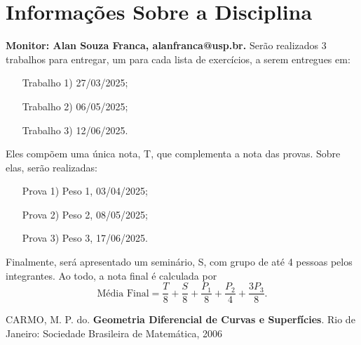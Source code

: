 \documentclass{article}
\begin{document}
\section{Informações Sobre a Disciplina}

\textbf{Monitor: Alan Souza Franca, alanfranca@usp.br.}
Serão realizados 3 trabalhos para entregar, um para cada lista de exercícios, a serem entregues em:
\begin{itemize}
	\item[Trabalho 1)] 27/03/2025;
	\item[Trabalho 2)] 06/05/2025;
	\item[Trabalho 3)] 12/06/2025.
\end{itemize}

Eles compõem uma única nota, T, que complementa a nota das provas. Sobre elas, serão realizadas:
\begin{itemize}
	\item[Prova 1)] Peso 1, 03/04/2025;
	\item[Prova 2)] Peso 2, 08/05/2025;
	\item[Prova 3)] Peso 3, 17/06/2025.
\end{itemize}

Finalmente, será apresentado um seminário, S, com grupo de até 4 pessoas pelos integrantes. Ao todo, a nota final é calculada por
\[
	\text{Média Final} = \frac{T}{8} + \frac{S}{8} + \frac{P_{1}}{8} + \frac{P_{2}}{4} + \frac{3P_{3}}{8}.
\]

\begin{thebibliography}{99}
	 CARMO, M. P. do. \textbf{Geometria Diferencial de Curvas e Superfícies}. Rio de Janeiro: Sociedade Brasileira de Matemática, 2006
\end{thebibliography}
\end{document}
